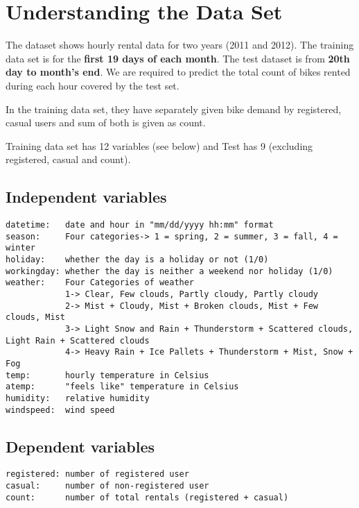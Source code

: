 \documentclass[]{book}
\begin{document}
\hypertarget{understanding-the-data-set}{%
\section{Understanding the Data Set}\label{understanding-the-data-set}}

The dataset shows hourly rental data for two years (2011 and 2012). The training data set is for the \textbf{first 19 days of each month}. The test dataset is from \textbf{20th day to month's end}. We are required to predict the total count of bikes rented during each hour covered by the test set.

In the training data set, they have separately given bike demand by registered, casual users and sum of both is given as count.

Training data set has 12 variables (see below) and Test has 9 (excluding registered, casual and count).

\hypertarget{independent-variables}{%
\subsection{Independent variables}\label{independent-variables}}

\begin{verbatim}
datetime:   date and hour in "mm/dd/yyyy hh:mm" format
season:     Four categories-> 1 = spring, 2 = summer, 3 = fall, 4 = winter
holiday:    whether the day is a holiday or not (1/0)
workingday: whether the day is neither a weekend nor holiday (1/0)
weather:    Four Categories of weather
            1-> Clear, Few clouds, Partly cloudy, Partly cloudy
            2-> Mist + Cloudy, Mist + Broken clouds, Mist + Few clouds, Mist
            3-> Light Snow and Rain + Thunderstorm + Scattered clouds, Light Rain + Scattered clouds
            4-> Heavy Rain + Ice Pallets + Thunderstorm + Mist, Snow + Fog
temp:       hourly temperature in Celsius
atemp:      "feels like" temperature in Celsius
humidity:   relative humidity
windspeed:  wind speed
\end{verbatim}

\hypertarget{dependent-variables}{%
\subsection{Dependent variables}\label{dependent-variables}}

\begin{verbatim}
registered: number of registered user
casual:     number of non-registered user
count:      number of total rentals (registered + casual)
\end{verbatim}
\end{document}
